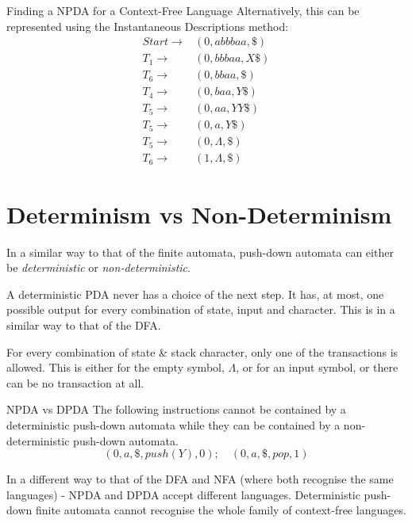 \begin{example}{Finding a NPDA for a Context-Free Language}
Alternatively, this can be represented using the Instantaneous Descriptions method:
\begin{align*}
Start \rightarrow & (0, abbbaa, \$)\\
T_1 \rightarrow & (0, bbbaa, X\$)\\
T_6 \rightarrow & (0, bbaa, \$)\\
T_4 \rightarrow & (0, baa, Y\$)\\
T_5 \rightarrow & (0, aa, YY\$)\\
T_5 \rightarrow & (0, a, Y\$)\\
T_5 \rightarrow & (0,\Lambda, \$)\\
T_6 \rightarrow & (1, \Lambda, \$)
\end{align*}

\end{example}

\section{Determinism vs Non-Determinism}
In a similar way to that of the finite automata, push-down automata can either be \textit{deterministic} or \textit{non-deterministic}. 

A deterministic PDA never has a choice of the next step. It has, at most, one possible output for every combination of state, input and character. This is in a similar way to that of the DFA. 

For every combination of state \& stack character, only one of the transactions is allowed. This is either for the empty symbol, $\Lambda$, or for an input symbol, or there can be no transaction at all. 

\begin{example}{NPDA vs DPDA}
The following instructions cannot be contained by a deterministic push-down automata while they can be contained by a non-deterministic push-down automata.
\[(0, a, \$, push(Y), 0); \quad (0, a, \$, pop, 1)\]   
\end{example}

In a different way to that of the DFA and NFA (where both recognise the same languages) - NPDA and DPDA accept different languages. Deterministic push-down finite automata cannot recognise the whole family of context-free languages. 

